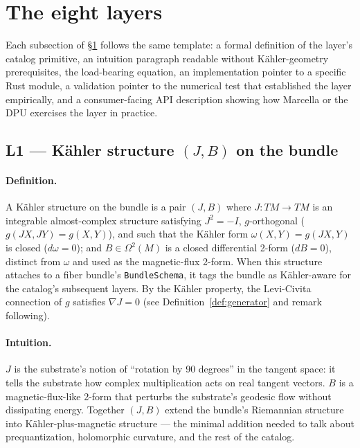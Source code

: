\documentclass[11pt,letterpaper]{article}
\begin{document}
\section{The eight layers}
\label{sec:layers}

Each subsection of \S\ref{sec:layers} follows the same template: a
formal definition of the layer's catalog primitive, an intuition
paragraph readable without K\"ahler-geometry prerequisites, the
load-bearing equation, an implementation pointer to a specific Rust
module, a validation pointer to the numerical test that established
the layer empirically, and a consumer-facing API description showing
how Marcella or the DPU exercises the layer in practice.

\subsection{L1 --- K\"ahler structure $(J, B)$ on the bundle}

\paragraph{Definition.}
A K\"ahler structure on the bundle is a pair $(J, B)$ where
$J: TM \to TM$ is an integrable almost-complex structure satisfying
$J^2 = -I$, $g$-orthogonal ($g(JX, JY) = g(X, Y)$), and such that the
K\"ahler form $\omega(X, Y) = g(JX, Y)$ is closed ($d\omega = 0$);
and $B \in \Omega^2(M)$ is a closed differential 2-form ($dB = 0$),
distinct from $\omega$ and used as the magnetic-flux 2-form. When
this structure attaches to a fiber bundle's \texttt{BundleSchema},
it tags the bundle as K\"ahler-aware for the catalog's subsequent
layers. By the K\"ahler property, the Levi-Civita connection of $g$
satisfies $\nabla J = 0$ (see Definition~\ref{def:generator} and
remark following).

\paragraph{Intuition.}
$J$ is the substrate's notion of ``rotation by 90 degrees'' in the
tangent space: it tells the substrate how complex multiplication
acts on real tangent vectors. $B$ is a magnetic-flux-like 2-form
that perturbs the substrate's geodesic flow without dissipating
energy. Together $(J, B)$ extend the bundle's Riemannian structure
into K\"ahler-plus-magnetic structure --- the minimal addition
needed to talk about prequantization, holomorphic curvature, and
the rest of the catalog.
\end{document}
